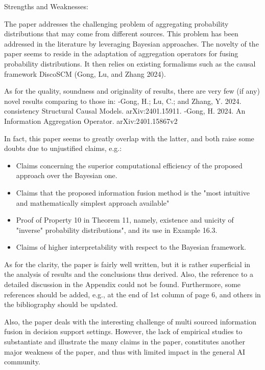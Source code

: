 \documentclass[letterpaper]{article} %
\begin{document}
\begin{CJK*}{UTF8}{gbsn}
Strengths and Weaknesses:

The paper addresses the challenging problem of aggregating probability distributions that may come from different sources. This problem has been addressed in the literature by leveraging Bayesian approaches. The novelty of the paper seems to reside in the adaptation of aggregation operators for fusing probability distributions. It then relies on existing formalisms such as the causal framework DiscoSCM (Gong, Lu, and Zhang 2024).

As for the quality, soundness and originality of results, there are very few (if any) novel results comparing to those in: -Gong, H.; Lu, C.; and Zhang, Y. 2024. consistency Structural Causal Models. arXiv:2401.15911. -Gong, H. 2024. An Information Aggregation Operator. arXiv:2401.15867v2

In fact, this paper seems to greatly overlap with the latter, and both raise some doubts due to unjustified claims, e.g.: 
\begin{itemize}
\item Claims concerning the superior computational efficiency of the proposed approach over the Bayesian one.
\item Claims that the proposed information fusion method is the "most intuitive and mathematically simplest approach available"
\item Proof of Property 10 in Theorem 11, namely, existence and unicity of "inverse" probability distributions", and its use in Example 16.3. 
\item Claims of higher interpretability with respect to the Bayesian framework.
\end{itemize}

As for the clarity, the paper is fairly well written, but it is rather superficial in the analysis of results and the conclusions thus derived. Also, the reference to a detailed discussion in the Appendix could not be found. Furthermore, some references should be added, e.g., at the end of 1st column of page 6, and others in the bibliography should be updated.

Also, the paper deals with the interesting challenge of multi sourced information fusion in decision support settings. However, the lack of empirical studies to substantiate and illustrate the many claims in the paper, constitutes another major weakness of the paper, and thus with limited impact in the general AI community.







\end{CJK*}
\end{document}
